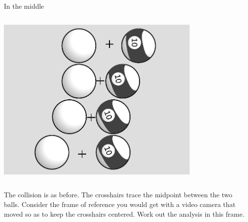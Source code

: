 \begin{frame}{In the middle}


  \begin{mycolumns}

    \begin{column}{.4\textwidth}\includegraphics[width=4in]{ch06/figs/pool-balls-energy-momentum-cm}\end{column}

    \begin{column}{.6\textwidth}

      The collision is as before. The crosshairs trace the midpoint between the two balls. Consider the frame
      of reference you would get with a video camera that moved so as to keep the crosshairs centered.
      Work out the analysis in this frame.

    \end{column}
  \end{mycolumns}

\end{frame}

